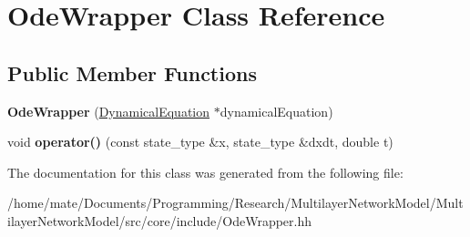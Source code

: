 \hypertarget{classOdeWrapper}{}\section{Ode\+Wrapper Class Reference}
\label{classOdeWrapper}
\subsection*{Public Member Functions}
\begin{DoxyCompactItemize}
\item 
{\bfseries Ode\+Wrapper} (\hyperlink{classDynamicalEquation}{Dynamical\+Equation} $\ast$dynamical\+Equation)\hypertarget{classOdeWrapper_aa8040393c4c88a9ab4dd8e635bbf5013}{}\label{classOdeWrapper_aa8040393c4c88a9ab4dd8e635bbf5013}

\item 
void {\bfseries operator()} (const state\+\_\+type \&x, state\+\_\+type \&dxdt, double t)\hypertarget{classOdeWrapper_a33b79d119cfe08c509865c30fb9b0d22}{}\label{classOdeWrapper_a33b79d119cfe08c509865c30fb9b0d22}

\end{DoxyCompactItemize}


The documentation for this class was generated from the following file\+:\begin{DoxyCompactItemize}
\item 
/home/mate/\+Documents/\+Programming/\+Research/\+Multilayer\+Network\+Model/\+Multilayer\+Network\+Model/src/core/include/Ode\+Wrapper.\+hh\end{DoxyCompactItemize}
